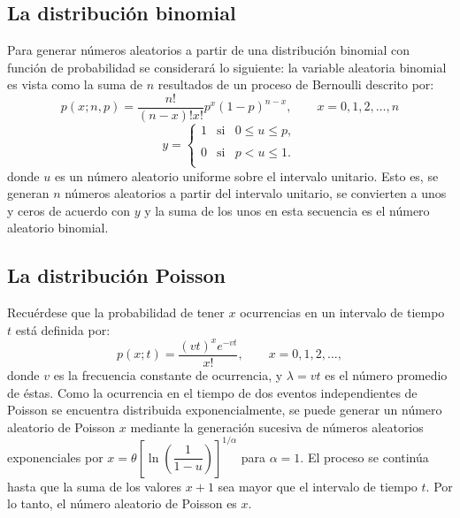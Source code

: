\subsection{La distribución binomial}
Para generar números aleatorios a partir de una distribución binomial con función de probabilidad se considerará lo siguiente: la variable aleatoria binomial es vista como la suma de $n$ resultados de un proceso de Bernoulli descrito por:
$$p(x;n,p)=\dfrac{n!}{(n-x)!x!}p^x(1-p)^{n-x},\qquad x=0,1,2,\ldots,n$$
$$y=\left\{\begin{array}{rcl}
	1 & \mbox{si} & 0\leq u \leq p,\\\\
	0 & \mbox{si} & p<u\leq 1.\\
\end{array}\right.$$
donde $u$ es un número aleatorio uniforme sobre el intervalo unitario. Esto es, se generan $n$ números aleatorios a partir del intervalo unitario, se convierten a unos y ceros de acuerdo con $y$ y la suma de los unos en esta secuencia es el número aleatorio binomial.

\subsection{La distribución Poisson}
Recuérdese que la probabilidad de tener $x$ ocurrencias en un intervalo de tiempo $t$ está definida por:
$$p(x;t)=\dfrac{(vt)^x e^{-vt}}{x!},\qquad x=0,1,2,\ldots,$$
donde $v$ es la frecuencia constante de ocurrencia, y $\lambda=vt$ es el número promedio de éstas. Como la ocurrencia en el tiempo de dos eventos independientes de Poisson se encuentra distribuida exponencialmente, se puede generar un número aleatorio de Poisson $x$ mediante la generación sucesiva de números aleatorios exponenciales por $x=\theta\left[\ln\left(\dfrac{1}{1-u}\right)\right]^{1/\alpha}$ para $\alpha=1$. El proceso se continúa hasta que la suma de los valores $x+1$ sea mayor que el intervalo de tiempo $t$. Por lo tanto, el número aleatorio de Poisson es $x$.
